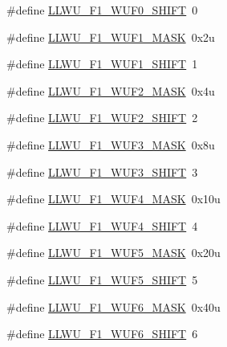 \begin{DoxyCompactItemize}
\item 
\#define \hyperlink{group___l_l_w_u___register___masks_ga6a004e1e5a54356cf5b70d9f17b96afc}{L\+L\+W\+U\+\_\+\+F1\+\_\+\+W\+U\+F0\+\_\+\+S\+H\+I\+FT}~0
\item 
\#define \hyperlink{group___l_l_w_u___register___masks_ga3513d59cf672e1dfd8884672b57c879b}{L\+L\+W\+U\+\_\+\+F1\+\_\+\+W\+U\+F1\+\_\+\+M\+A\+SK}~0x2u
\item 
\#define \hyperlink{group___l_l_w_u___register___masks_gadfac3bafc6a624b27f059e3d9cf3a899}{L\+L\+W\+U\+\_\+\+F1\+\_\+\+W\+U\+F1\+\_\+\+S\+H\+I\+FT}~1
\item 
\#define \hyperlink{group___l_l_w_u___register___masks_gabc46629018d0f2eb7a39896eb5225933}{L\+L\+W\+U\+\_\+\+F1\+\_\+\+W\+U\+F2\+\_\+\+M\+A\+SK}~0x4u
\item 
\#define \hyperlink{group___l_l_w_u___register___masks_gab99e1778fd26ccd69f31a56d94709e41}{L\+L\+W\+U\+\_\+\+F1\+\_\+\+W\+U\+F2\+\_\+\+S\+H\+I\+FT}~2
\item 
\#define \hyperlink{group___l_l_w_u___register___masks_ga7c81d1a3309d56f967355042ac08c299}{L\+L\+W\+U\+\_\+\+F1\+\_\+\+W\+U\+F3\+\_\+\+M\+A\+SK}~0x8u
\item 
\#define \hyperlink{group___l_l_w_u___register___masks_gada64305bc36dde8d293f511de2183d0c}{L\+L\+W\+U\+\_\+\+F1\+\_\+\+W\+U\+F3\+\_\+\+S\+H\+I\+FT}~3
\item 
\#define \hyperlink{group___l_l_w_u___register___masks_ga9dad2dc81874baa09dac37d10cc4781d}{L\+L\+W\+U\+\_\+\+F1\+\_\+\+W\+U\+F4\+\_\+\+M\+A\+SK}~0x10u
\item 
\#define \hyperlink{group___l_l_w_u___register___masks_ga4ce65dd6db7f89bd5e6f0fb7df47a399}{L\+L\+W\+U\+\_\+\+F1\+\_\+\+W\+U\+F4\+\_\+\+S\+H\+I\+FT}~4
\item 
\#define \hyperlink{group___l_l_w_u___register___masks_ga2ba67283979e853e1601bd15a534523e}{L\+L\+W\+U\+\_\+\+F1\+\_\+\+W\+U\+F5\+\_\+\+M\+A\+SK}~0x20u
\item 
\#define \hyperlink{group___l_l_w_u___register___masks_ga56f1fa2e4a277de750be421a3b35df87}{L\+L\+W\+U\+\_\+\+F1\+\_\+\+W\+U\+F5\+\_\+\+S\+H\+I\+FT}~5
\item 
\#define \hyperlink{group___l_l_w_u___register___masks_ga25c6fc1f914e4e6cdc9863e9910a7a18}{L\+L\+W\+U\+\_\+\+F1\+\_\+\+W\+U\+F6\+\_\+\+M\+A\+SK}~0x40u
\item 
\#define \hyperlink{group___l_l_w_u___register___masks_gadc6ba47e215a21859a0cdb07637e3720}{L\+L\+W\+U\+\_\+\+F1\+\_\+\+W\+U\+F6\+\_\+\+S\+H\+I\+FT}~6
\item 

\end{DoxyCompactItemize}
